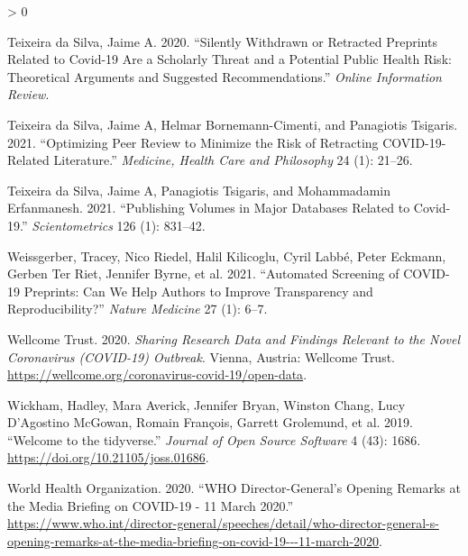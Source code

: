 \documentclass[
]{article}
\newlength{\cslhangindent}
\newenvironment{CSLReferences}[2] %
 {%
  \setlength{\parindent}{0pt}
  \ifodd #1 \everypar{\setlength{\hangindent}{\cslhangindent}}\ignorespaces\fi
  \ifnum #2 > 0
  \setlength{\parskip}{#2\baselineskip}
  \fi
 }%
 {}
\begin{document}
\begin{CSLReferences}{1}{0}
\leavevmode\hypertarget{ref-da2020silently}{}%
Teixeira da Silva, Jaime A. 2020. {``Silently Withdrawn or Retracted Preprints Related to Covid-19 Are a Scholarly Threat and a Potential Public Health Risk: Theoretical Arguments and Suggested Recommendations.''} \emph{Online Information Review}.

\leavevmode\hypertarget{ref-da2021optimizing}{}%
Teixeira da Silva, Jaime A, Helmar Bornemann-Cimenti, and Panagiotis Tsigaris. 2021. {``Optimizing Peer Review to Minimize the Risk of Retracting COVID-19-Related Literature.''} \emph{Medicine, Health Care and Philosophy} 24 (1): 21--26.

\leavevmode\hypertarget{ref-da2021publishing}{}%
Teixeira da Silva, Jaime A, Panagiotis Tsigaris, and Mohammadamin Erfanmanesh. 2021. {``Publishing Volumes in Major Databases Related to Covid-19.''} \emph{Scientometrics} 126 (1): 831--42.

\leavevmode\hypertarget{ref-weissgerber2021automated}{}%
Weissgerber, Tracey, Nico Riedel, Halil Kilicoglu, Cyril Labbé, Peter Eckmann, Gerben Ter Riet, Jennifer Byrne, et al. 2021. {``Automated Screening of COVID-19 Preprints: Can We Help Authors to Improve Transparency and Reproducibility?''} \emph{Nature Medicine} 27 (1): 6--7.

\leavevmode\hypertarget{ref-citeWellcome}{}%
Wellcome Trust. 2020. \emph{Sharing Research Data and Findings Relevant to the Novel Coronavirus (COVID-19) Outbreak}. Vienna, Austria: Wellcome Trust. \url{https://wellcome.org/coronavirus-covid-19/open-data}.

\leavevmode\hypertarget{ref-citetidyverse}{}%
Wickham, Hadley, Mara Averick, Jennifer Bryan, Winston Chang, Lucy D'Agostino McGowan, Romain François, Garrett Grolemund, et al. 2019. {``Welcome to the {tidyverse}.''} \emph{Journal of Open Source Software} 4 (43): 1686. \url{https://doi.org/10.21105/joss.01686}.

\leavevmode\hypertarget{ref-citeWHOtimeline}{}%
World Health Organization. 2020. {``WHO Director-General's Opening Remarks at the Media Briefing on COVID-19 - 11 March 2020.''} \url{https://www.who.int/director-general/speeches/detail/who-director-general-s-opening-remarks-at-the-media-briefing-on-covid-19---11-march-2020}.

\end{CSLReferences}
\end{document}
